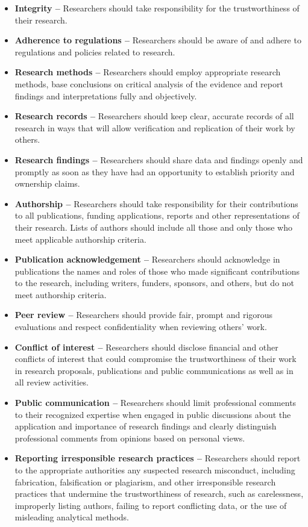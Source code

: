 \documentclass[
]{book}
\begin{document}
\begin{itemize}
\item
  \textbf{Integrity --} Researchers should take responsibility for the trustworthiness of their research.
\item
  \textbf{Adherence to regulations --} Researchers should be aware of and adhere to regulations and policies related to research.
\item
  \textbf{Research methods --} Researchers should employ appropriate research methods, base conclusions on critical analysis of the evidence and report findings and interpretations fully and objectively.
\item
  \textbf{Research records --} Researchers should keep clear, accurate records of all research in ways that will allow verification and replication of their work by others.
\item
  \textbf{Research findings --} Researchers should share data and findings openly and promptly as soon as they have had an opportunity to establish priority and ownership claims.
\item
  \textbf{Authorship --} Researchers should take responsibility for their contributions to all publications, funding applications, reports and other representations of their research. Lists of authors should include all those and only those who meet applicable authorship criteria.
\item
  \textbf{Publication acknowledgement --} Researchers should acknowledge in publications the names and roles of those who made significant contributions to the research, including writers, funders, sponsors, and others, but do not meet authorship criteria.
\item
  \textbf{Peer review --} Researchers should provide fair, prompt and rigorous evaluations and respect confidentiality when reviewing others' work.
\item
  \textbf{Conflict of interest --} Researchers should disclose financial and other conflicts of interest that could compromise the trustworthiness of their work in research proposals, publications and public communications as well as in all review activities.
\item
  \textbf{Public communication --} Researchers should limit professional comments to their recognized expertise when engaged in public discussions about the application and importance of research findings and clearly distinguish professional comments from opinions based on personal views.
\item
  \textbf{Reporting irresponsible research practices --} Researchers should report to the appropriate authorities any suspected research misconduct, including fabrication, falsification or plagiarism, and other irresponsible research practices that undermine the trustworthiness of research, such as carelessness, improperly listing authors, failing to report conflicting data, or the use of misleading analytical methods.

\end{itemize}
\end{document}
